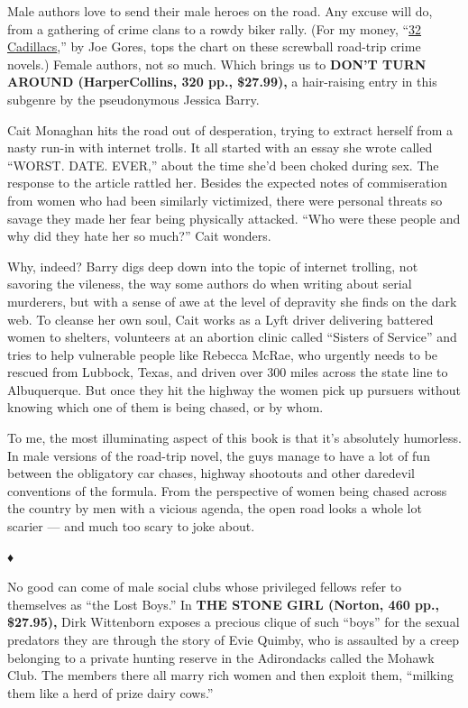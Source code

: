 Male authors love to send their male heroes on the road. Any excuse will
do, from a gathering of crime clans to a rowdy biker rally. (For my
money,
``\href{https://www.nytimes3xbfgragh.onion/1992/12/20/books/crime-070792.html}{32
Cadillacs},'' by Joe Gores, tops the chart on these screwball road-trip
crime novels.) Female authors, not so much. Which brings us to
\textbf{DON'T TURN AROUND (HarperCollins, 320 pp., \$27.99),} a
hair-raising entry in this subgenre by the pseudonymous Jessica Barry.

Cait Monaghan hits the road out of desperation, trying to extract
herself from a nasty run-in with internet trolls. It all started with an
essay she wrote called ``WORST. DATE. EVER,'' about the time she'd been
choked during sex. The response to the article rattled her. Besides the
expected notes of commiseration from women who had been similarly
victimized, there were personal threats so savage they made her fear
being physically attacked. ``Who were these people and why did they hate
her so much?'' Cait wonders.

Why, indeed? Barry digs deep down into the topic of internet trolling,
not savoring the vileness, the way some authors do when writing about
serial murderers, but with a sense of awe at the level of depravity she
finds on the dark web. To cleanse her own soul, Cait works as a Lyft
driver delivering battered women to shelters, volunteers at an abortion
clinic called ``Sisters of Service'' and tries to help vulnerable people
like Rebecca McRae, who urgently needs to be rescued from Lubbock,
Texas, and driven over 300 miles across the state line to Albuquerque.
But once they hit the highway the women pick up pursuers without knowing
which one of them is being chased, or by whom.

To me, the most illuminating aspect of this book is that it's absolutely
humorless. In male versions of the road-trip novel, the guys manage to
have a lot of fun between the obligatory car chases, highway shootouts
and other daredevil conventions of the formula. From the perspective of
women being chased across the country by men with a vicious agenda, the
open road looks a whole lot scarier --- and much too scary to joke
about.

♦

No good can come of male social clubs whose privileged fellows refer to
themselves as ``the Lost Boys.'' In \textbf{THE STONE GIRL (Norton, 460
pp., \$27.95),} Dirk Wittenborn exposes a precious clique of such
``boys'' for the sexual predators they are through the story of Evie
Quimby, who is assaulted by a creep belonging to a private hunting
reserve in the Adirondacks called the Mohawk Club. The members there all
marry rich women and then exploit them, ``milking them like a herd of
prize dairy cows.''

